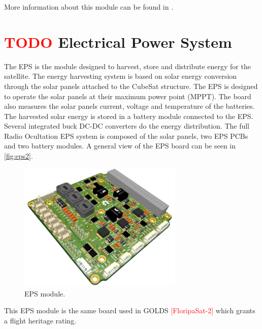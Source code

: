 More information about this module can be found in \cite{ttc}.


\section{ \textcolor{red}{TODO} Electrical Power System}

The EPS is the module designed to harvest, store and distribute energy for the satellite. The energy harvesting system is based on solar energy conversion through the solar panels attached to the CubeSat structure. The EPS is designed to operate the solar panels at their maximum power point (MPPT). The board also measures the solar panels current, voltage and temperature of the batteries. The harvested solar energy is stored in a battery module connected to the EPS. Several integrated buck DC-DC converters do the energy distribution. The full Radio Ocultation EPS system is composed of the solar panels, two EPS PCBs and two battery modules. A general view of the EPS board can be seen in \autoref{fig:eps2}.

\begin{figure}[!ht]
    \begin{center}
        \includegraphics[width=0.7\textwidth]{figures/subsystems/eps2-pcb-3d}
        \caption{EPS module.}
        \label{fig:eps2}
    \end{center}
\end{figure}

This EPS module is the same board used in GOLDS \textcolor{red}{[FloripaSat-2]} which grants a flight heritage rating. %

